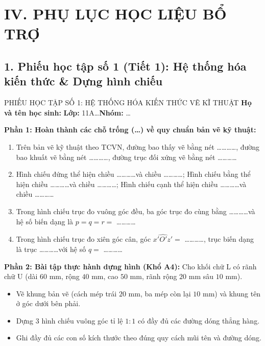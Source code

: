 \documentclass[12pt, a4paper]{article}
\begin{document}
\section*{IV. PHỤ LỤC HỌC LIỆU BỔ TRỢ}

\subsection*{1. Phiếu học tập số 1 (Tiết 1): Hệ thống hóa kiến thức \& Dựng hình chiếu}

\begin{pedabox}{PHIẾU HỌC TẬP SỐ 1: HỆ THỐNG HÓA KIẾN THỨC VẼ KĨ THUẬT}
\textbf{Họ và tên học sinh:} \dotfill \textbf{Lớp:} 11A\dots \quad \textbf{Nhóm:} \dots

\textbf{Phần 1: Hoàn thành các chỗ trống (\dots) về quy chuẩn bản vẽ kỹ thuật:}
\begin{enumerate}[leftmargin=0.6cm]
    \item Trên bản vẽ kỹ thuật theo TCVN, đường bao thấy vẽ bằng nét \dots\dots\dots\dots, đường bao khuất vẽ bằng nét \dots\dots\dots\dots, đường trục đối xứng vẽ bằng nét \dots\dots\dots\dots
    \item Hình chiếu đứng thể hiện chiều \dots\dots\dots\dots và chiều \dots\dots\dots\dots; Hình chiếu bằng thể hiện chiều \dots\dots\dots\dots và chiều \dots\dots\dots\dots; Hình chiếu cạnh thể hiện chiều \dots\dots\dots\dots và chiều \dots\dots\dots\dots
    \item Trong hình chiếu trục đo vuông góc đều, ba góc trục đo cùng bằng \dots\dots\dots\dots và hệ số biến dạng là $p = q = r = $ \dots\dots\dots\dots
    \item Trong hình chiếu trục đo xiên góc cân, góc $\widehat{x'O'z'} = $ \dots\dots\dots\dots, trục biến dạng là trục \dots\dots\dots\dots với hệ số $q = $ \dots\dots\dots\dots
\end{enumerate}

\textbf{Phần 2: Bài tập thực hành dựng hình (Khổ A4):}
Cho khối chữ L có rãnh chữ U (dài $60\text{ mm}$, rộng $40\text{ mm}$, cao $50\text{ mm}$, rãnh rộng $20\text{ mm}$ sâu $10\text{ mm}$).
\begin{itemize}[leftmargin=0.6cm]
    \item[a)] Vẽ khung bản vẽ (cách mép trái $20\text{ mm}$, ba mép còn lại $10\text{ mm}$) và khung tên ở góc dưới bên phải.
    \item[b)] Dựng 3 hình chiếu vuông góc tỉ lệ $1:1$ có đầy đủ các đường dóng thẳng hàng.
    \item[c)] Ghi đầy đủ các con số kích thước theo đúng quy cách mũi tên và đường dóng.
\end{itemize}
\end{pedabox}
\end{document}

